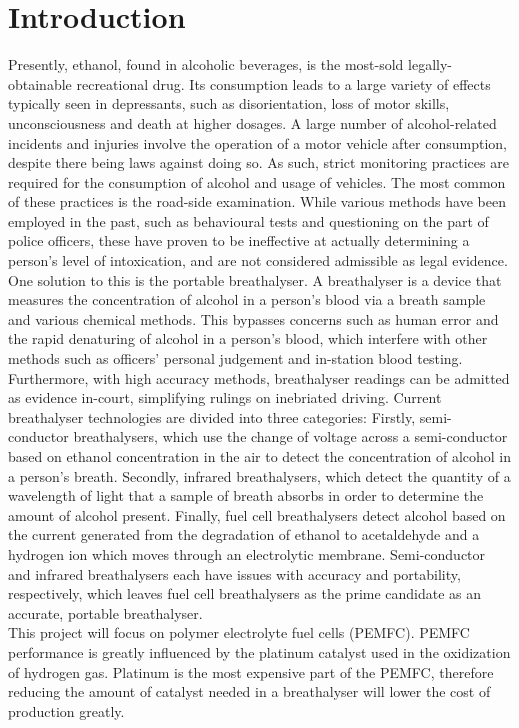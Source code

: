 \documentclass{article}
\begin{document}
	\section{Introduction}
	Presently, ethanol, found in alcoholic beverages, is the most-sold legally-obtainable recreational drug. Its consumption leads to a large variety of effects typically seen in depressants, such as disorientation, loss of motor skills, unconsciousness and death at higher dosages. A large number of alcohol-related incidents and injuries involve the operation of a motor vehicle after consumption, despite there being laws against doing so. As such, strict monitoring practices are required for the consumption of alcohol and usage of vehicles. The most common of these practices is the road-side examination. While various methods have been employed in the past, such as behavioural tests and questioning on the part of police officers, these have proven to be ineffective at actually determining a person’s level of intoxication, and are not considered admissible as legal evidence. \\
	One solution to this is the portable breathalyser. A breathalyser is a device that measures the concentration of alcohol in a person’s blood via a breath sample and various chemical methods. This bypasses concerns such as human error and the rapid denaturing of alcohol in a person’s blood, which interfere with other methods such as officers’ personal judgement and in-station blood testing. Furthermore, with high accuracy methods, breathalyser readings can be admitted as evidence in-court, simplifying rulings on inebriated driving. Current breathalyser technologies are divided into three categories: Firstly, semi-conductor breathalysers, which use the change of voltage across a semi-conductor based on ethanol concentration in the air to detect the concentration of alcohol in a person’s breath. Secondly, infrared breathalysers, which detect the quantity of a wavelength of light that a sample of breath absorbs in order to determine the amount of alcohol present. Finally, fuel cell breathalysers detect alcohol based on the current generated from the degradation of ethanol to acetaldehyde and a hydrogen ion which moves through an electrolytic membrane. Semi-conductor and infrared breathalysers each have issues with accuracy and portability, respectively, which leaves fuel cell breathalysers as the prime candidate as an accurate, portable breathalyser.\\
	This project will focus on polymer electrolyte fuel cells (PEMFC). PEMFC performance is greatly influenced by the platinum catalyst used in the oxidization of hydrogen gas. Platinum is the most expensive part of the PEMFC, therefore reducing the amount of catalyst needed in a breathalyser will lower the cost of production greatly.
\end{document}
